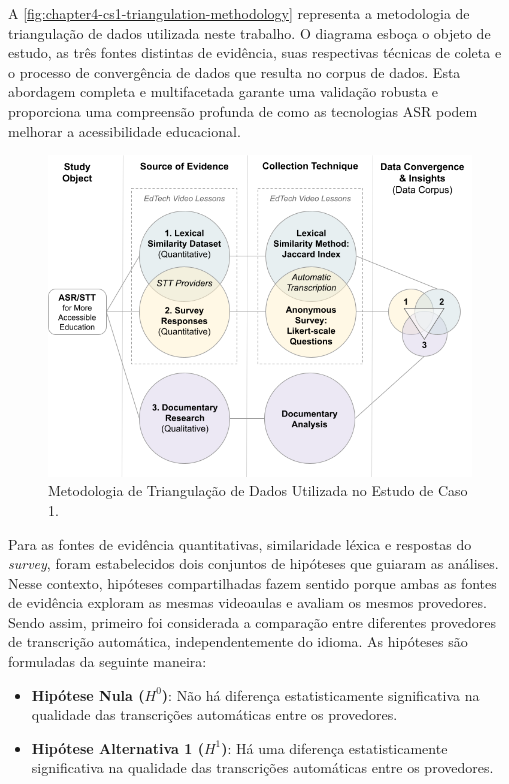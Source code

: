 A \autoref{fig:chapter4-cs1-triangulation-methodology} representa a metodologia de triangulação de dados utilizada neste trabalho. O diagrama esboça o objeto de estudo, as três fontes distintas de evidência, suas respectivas técnicas de coleta e o processo de convergência de dados que resulta no corpus de dados. Esta abordagem completa e multifacetada garante uma validação robusta e proporciona uma compreensão profunda de como as tecnologias ASR podem melhorar a acessibilidade educacional.

\begin{figure}[htb]
\centering
\caption{Metodologia de Triangulação de Dados Utilizada no Estudo de Caso 1.}
\label{fig:chapter4-cs1-triangulation-methodology}
\includegraphics[width=.9\textwidth]{images/chapter4-cs1-triangulation-methodology.png}
\end{figure}

Para as fontes de evidência quantitativas, similaridade léxica e respostas do \textit{survey}, foram estabelecidos dois conjuntos de hipóteses que guiaram as análises. Nesse contexto, hipóteses compartilhadas fazem sentido porque ambas as fontes de evidência exploram as mesmas videoaulas e avaliam os mesmos provedores. Sendo assim, primeiro foi considerada a comparação entre diferentes provedores de transcrição automática, independentemente do idioma. As hipóteses são formuladas da seguinte maneira:

\begin{itemize}
\item \textbf{Hipótese Nula ($H^0$)}: Não há diferença estatisticamente significativa na qualidade das transcrições automáticas entre os provedores.
\item \textbf{Hipótese Alternativa 1 ($H^1$)}: Há uma diferença estatisticamente significativa na qualidade das transcrições automáticas entre os provedores.
\end{itemize}

